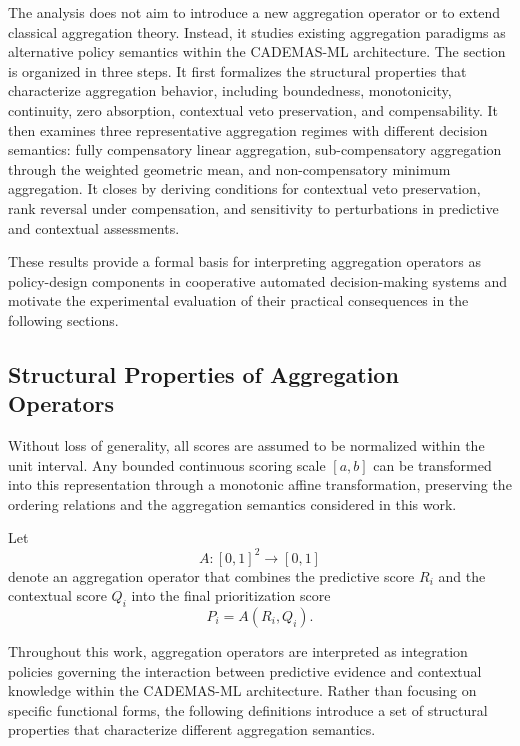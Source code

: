 \documentclass[mathematics,article,submit,moreauthors]{Definitions/mdpi}
\begin{document}
The analysis does not aim to introduce a new aggregation operator or to
extend classical aggregation theory. Instead, it studies existing
aggregation paradigms as alternative policy semantics within the
CADEMAS-ML architecture. {\color{teal}The section is organized in three
steps. It first formalizes the structural properties that characterize
aggregation behavior, including boundedness, monotonicity, continuity, zero
absorption, contextual veto preservation, and compensability. It then
examines three representative aggregation regimes with different decision
semantics: fully compensatory linear aggregation, sub-compensatory
aggregation through the weighted geometric mean, and non-compensatory
minimum aggregation. It closes by deriving conditions for contextual veto
preservation, rank reversal under compensation, and sensitivity to
perturbations in predictive and contextual assessments.}

These results provide a formal basis for interpreting aggregation
operators as policy-design components in cooperative automated
decision-making systems and motivate the experimental evaluation of
their practical consequences in the following sections.


\subsection{Structural Properties of Aggregation Operators}
\label{subsec:structural-properties}

Without loss of generality, all scores are assumed to be normalized
within the unit interval. Any bounded continuous scoring scale
$[a,b]$ can be transformed into this representation through a monotonic
affine transformation, preserving the ordering relations and the
aggregation semantics considered in this work.

Let
\begin{equation}
A:[0,1]^2 \rightarrow [0,1]
\end{equation}
denote an aggregation operator that combines the predictive score
$R_i$ and the contextual score $Q_i$ into the final prioritization
score
\begin{equation}
P_i=A(R_i,Q_i).
\end{equation}

Throughout this work, aggregation operators are interpreted as
integration policies governing the interaction between predictive
evidence and contextual knowledge within the CADEMAS-ML architecture.
{\color{teal}Rather than focusing on specific functional forms, the
following definitions introduce a set of structural properties that
characterize different aggregation semantics.}
\end{document}
